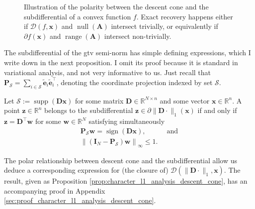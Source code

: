 \begin{figure}[H]
    \centering
    
    \caption[Polarity between descent cone and subdifferential]{Illustration of the polarity between the descent cone and the subdifferential of a convex function $f$. Exact recovery happens either if $\mathcal{D}(f, \mathbf{x})$ and $\operatorname{null} \left ( \mathbf{A} \right )$ intersect trivially, or equivalently if $\partial f(\mathbf{x})$ and $\operatorname{range} \left( \mathbf{A} \right)$ intersect non-trivially.}
    \label{fig:illustration_descent_cone_subdifferential}
\end{figure}

The subdifferential of the \acrshort{gtv} semi-norm has simple defining expressions, which I write down in the next proposition. I omit its proof because it is standard in variational analysis, and not very informative to us. Just recall that $\mathbf{P}_{\mathcal{S}} = \sum_{i \in \mathcal{S}} \tilde{\mathbf{e}}_i \tilde{\mathbf{e}}_i^\top$, denoting the coordinate projection indexed by set $\mathcal{S}$.

\begin{proposition}\label{prop:character_subdifferential_l1}
    Let $\mathcal{S} := \operatorname{supp}\left ( \mathbf{Dx} \right )$ for some matrix $\mathbf{D} \in \mathbb{R}^{N \times n}$ and some vector $\mathbf{x} \in \mathbb{R}^{n}$. A point $\mathbf{z} \in \mathbb{R}^{n}$ belongs to the subdifferential $\mathbf{z} \in \partial \|\mathbf{D} \cdot \|_1 (\mathbf{x})$ if and only if $\mathbf{z} = \mathbf{D}^\top \mathbf{w}$ for some $\mathbf{w} \in \mathbb{R}^{N}$ satisfying simultaneously
    \begin{align}
        \mathbf{P}_{\mathcal{S}} \mathbf{w} = \operatorname{sign} \left ( \mathbf{Dx} \right ), & \enspace \text{and}\\
        \left \| \left ( \mathbf{I}_N - \mathbf{P}_\mathcal{S} \right ) \mathbf{w} \right \|_{\infty} \leq 1.
    \end{align}
\end{proposition}

The polar relationship between descent cone and the subdifferential allow us deduce a corresponding expression for (the closure of) $\mathcal{D}(\| \mathbf{D} \cdot \|_1, \mathbf{x})$. The result, given as Proposition \ref{prop:character_l1_analysis_descent_cone}, has an accompanying proof in Appendix \ref{sec:proof_character_l1_analysis_descent_cone}.

\clearpage

